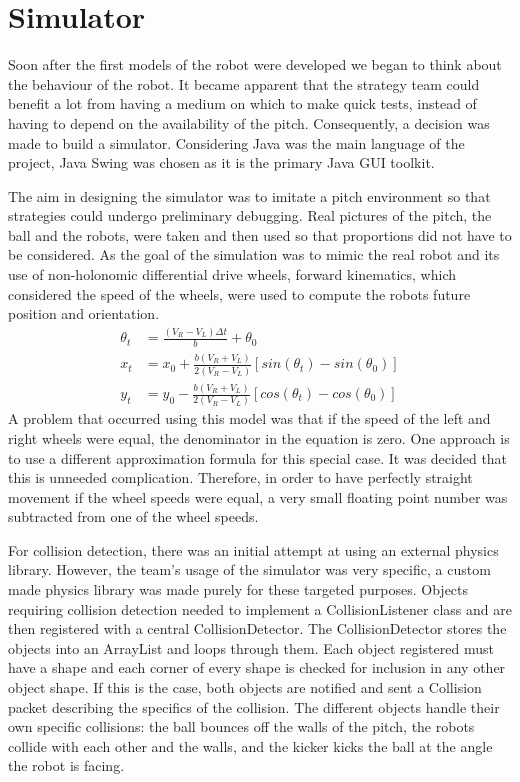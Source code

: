 \section{Simulator}

Soon after the first models of the robot were developed we began to think about the behaviour of the robot. It became apparent that the strategy team could benefit a lot from having a medium on which to make quick tests, instead of having to depend on the availability of the pitch. Consequently, a decision was made to build a simulator. Considering Java was the main language of the project, Java Swing was chosen as it is the primary Java GUI toolkit.\linebreak

The aim in designing the simulator was to imitate a pitch environment so that strategies could undergo preliminary debugging. Real pictures of the pitch, the ball and the robots, were taken and then used so that proportions did not have to be considered. As the goal of the simulation was to mimic the real robot and its use of  non-holonomic differential drive wheels, forward kinematics, which considered the speed of the wheels, were used to compute the robots future position and orientation.\linebreak
\begin{align}
\theta_{t} & = \frac{(V_{R}-V_{L})\Delta t}{b} + \theta_{0}\\
x_{t} & =x_0+ \frac{b(V_{R}+V_{L})}{2(V_{R}-V_{L})}[sin(\theta_{t})-sin(\theta_{0})]\\
y_{t} & =y_0- \frac{b(V_{R}+V_{L})}{2(V_{R}-V_{L})}[cos(\theta_{t})-cos(\theta_{0})]
\end{align}
A problem that occurred using this model was that if the speed of the left and right wheels were equal, the denominator in the equation is zero. One approach is to use a different approximation formula for this special case. It was decided that this is unneeded complication. Therefore, in order to have perfectly straight movement if the wheel speeds were equal, a very small floating point number was subtracted from one of the wheel speeds.\linebreak

For collision detection, there was an initial attempt at using an external physics library. However, the team’s usage of the simulator was very specific, a custom made physics library was made purely for these targeted purposes. Objects requiring collision detection needed to implement a CollisionListener class and are then registered with a central CollisionDetector. The CollisionDetector stores the objects into an ArrayList and loops through them. Each object registered must have a shape and each corner of every shape is checked for inclusion in any other object shape. If this is the case, both objects are notified and sent a Collision packet describing the specifics of the collision. The different objects handle their own specific collisions: the ball bounces off the walls of the pitch, the robots collide with each other and the walls, and the kicker kicks the ball at the angle the robot is facing. \linebreak

